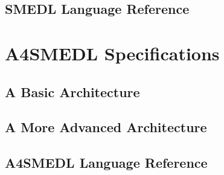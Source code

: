 \documentclass[paper=letter,titlepage,captions=tableheading]{scrartcl}
\begin{document}

\subsection{SMEDL Language Reference}
\label{subsec:smedl-ref}





\section{A4SMEDL Specifications}
\label{sec:a4smedl}

\subsection{A Basic Architecture}
\label{subsec:a4smedl-basic}

\subsection{A More Advanced Architecture}
\label{subsec:a4smedl-advanced}

\subsection{A4SMEDL Language Reference}
\label{subsec:a4smedl-ref}

\end{document}
